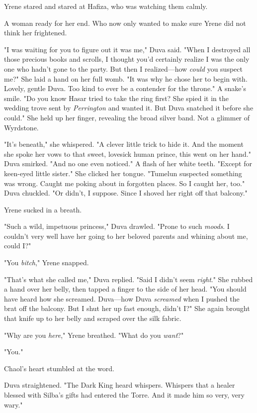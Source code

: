 Yrene stared and stared at Hafiza, who was watching them calmly.

A woman ready for her end. Who now only wanted to make sure Yrene did not think her frightened.

"I was waiting for you to figure out it was me," Duva said. "When I destroyed all those precious books and scrolls, I thought you'd certainly realize I was the only one who hadn't gone to the party. But then I realized---how \emph{could} you suspect me?" She laid a hand on her full womb. "It was why he chose her to begin with. Lovely, gentle Duva. Too kind to ever be a contender for the throne." A snake's smile. "Do you know Hasar tried to take the ring first? She spied it in the wedding trove sent by \emph{Perrington} and wanted it. But Duva snatched it before she could." She held up her finger, revealing the broad silver band. Not a glimmer of Wyrdstone.

"It's beneath," she whispered. "A clever little trick to hide it. And the moment she spoke her vows to that sweet, lovesick human prince, this went on her hand." Duva smirked. "And no one even noticed." A flash of her white teeth. "Except for keen-eyed little sister." She clicked her tongue. "Tumelun suspected something was wrong. Caught me poking about in forgotten places. So I caught her, too." Duva chuckled. "Or didn't, I suppose. Since I shoved her right off that balcony."

Yrene sucked in a breath.

"Such a wild, impetuous princess," Duva drawled. "Prone to such
\emph{moods}. I couldn't very well have her going to her beloved parents and whining about me, could I?"

"You \emph{bitch}," Yrene snapped.

"That's what she called me," Duva replied. "Said I didn't seem
\emph{right}." She rubbed a hand over her belly, then tapped a finger to the side of her head. "You should have heard how she screamed. Duva---how Duva \emph{screamed} when I pushed the brat off the balcony. But I shut her up fast enough, didn't I?" She again brought that knife up to her belly and scraped over the silk fabric.

"Why are you \emph{here}," Yrene breathed. "What do you
\emph{want}?"

"You."

Chaol's heart stumbled at the word.

Duva straightened. "The Dark King heard whispers. Whispers that a healer blessed with Silba's gifts had entered the Torre. And it made him so very, very wary."

